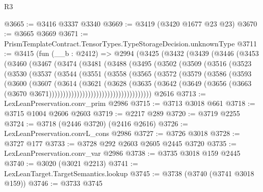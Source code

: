 \begin{lexlean}{R3}
\begin{coremodule}
@3665 := @3416 @3337 @3340
@3669 := @3419 (@3420 @1677 @23 @23)
@3670 := @3665 @3669
@3671 := PrismTemplateContract.TensorTypes.TypeStorageDecision.unknownType
@3711 := @3415
    (fun (__b : @2412) =>
    @2994
      (@3425
        (@3432
          (@3439
            (@3446
              (@3453
                (@3460
                  (@3467
                    (@3474
                      (@3481
                        (@3488
                          (@3495
                            (@3502
                              (@3509
                                (@3516
                                  (@3523
                                    (@3530
                                      (@3537
                                        (@3544
                                          (@3551
                                            (@3558
                                              (@3565
                                                (@3572
                                                  (@3579
                                                    (@3586
                                                      (@3593
                                                        (@3600
                                                          (@3607
                                                            (@3614
                                                              (@3621
                                                                (@3628
                                                                  (@3635
                                                                    (@3642
                                                                      (@3649
                                                                        (@3656
                                                                          (@3663
                                                                            (@3670
                                                                              @3671)))))))))))))))))))))))))))))))))))))
    @2616
@3713 := LexLeanPreservation.conv_prim @2986
@3715 := @3713 @3018 @661
@3718 := @3715 @1004 @2606 @2603
@3719 := @2217 @289
@3720 := @3719 @2255
@3724 := @3718 (@2446 @3720) (@2416 @2616)
@3726 := LexLeanPreservation.convL_cons @2986
@3727 := @3726 @3018
@3728 := @3727 @177
@3733 := @3728 @292 @2603 @2605 @2445 @3720
@3735 := LexLeanPreservation.conv_var @2986
@3738 := @3735 @3018 @159 @2445
@3740 := @3020 (@3021 @2213)
@3741 := LexLeanTarget.TargetSemantics.lookup
@3745 := @3738 (@3740 (@3741 @3018 @159))
@3746 := @3733 @3745

\end{coremodule}
\end{lexlean}
